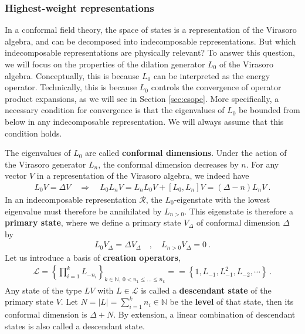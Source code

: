 \documentclass[12pt, a4paper]{article}
\theoremstyle{break}
\begin{document}
\subsubsection{Highest-weight representations}\label{sec:hwr}

In a conformal field theory, the space of states is a representation of the Virasoro algebra, and can be decomposed into indecomposable representations. But which indecomposable representations are physically relevant? To answer this question, we will focus on the properties of the dilation generator $L_0$ of the Virasoro algebra. Conceptually, this is because $L_0$ can be interpreted as the energy operator. Technically, this is because $L_0$ controls the convergence of operator product expansions, as we will see in Section \ref{sec:csope}. More specifically, a necessary condition for convergence is that the eigenvalues of $L_0$ be bounded from below in any indecomposable representation. We will always assume that this condition holds.

The eigenvalues of $L_0$ are called \textbf{conformal dimensions}. Under the action of the Virasoro generator $L_n$, the conformal dimension decreases by $n$. For any vector $V$ in a representation of the Virasoro algebra, we indeed have 
\begin{align}
 L_0V{} = \Delta V{} \quad \Rightarrow\quad  L_0 L_nV{} = L_nL_0V{} + [L_0, L_n] V{}  = (\Delta-n)L_nV{} \ .
\end{align}
In an indecomposable representation $\mathcal{R}$, the $L_0$-eigenstate with the lowest eigenvalue must therefore be annihilated by $L_{n>0}$. This eigenstate is therefore a \textbf{primary state}, where we define a primary state $V_\Delta$ of conformal dimension $\Delta$ by 
\begin{align}
  \boxed{L_0 V_\Delta = \Delta V_\Delta \quad , \quad L_{n>0} V_\Delta = 0}\ .
 \end{align}
Let us introduce a basis of \textbf{creation operators},
\begin{align}
 \mathcal{L} = \left\{\prod_{i=1}^k L_{-n_i} \right\}_{k\in\mathbb{N},\ 0<n_1\leq \dots \leq n_k}==\left\{1, L_{-1}, L_{-1}^2, L_{-2},\cdots \right\}\ .
 \label{lcm}
\end{align}
Any state of the type $L V{}$ with $L\in\mathcal{L}$ is called a \textbf{descendant state} of the primary state $V$. Let  $N=|L|=\sum_{i=1}^k n_i \in\mathbb{N}$ be the  \textbf{level} of that state, then its conformal dimension is $\Delta+N$. By extension, a linear combination of descendant states is also called a descendant state. 
\end{document}
